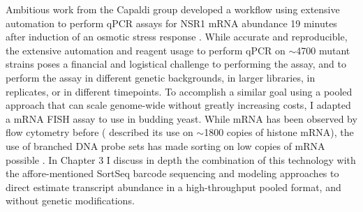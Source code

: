Ambitious work from the
Capaldi group developed a workflow using extensive automation to
perform qPCR assays for NSR1 mRNA abundance 19 minutes after induction
of an osmotic stress response 
\parencite{worley2016genome}. While accurate and
reproducible, the extensive automation and reagent usage to perform
qPCR on $\sim$4700 mutant strains poses a financial and logistical
challenge to performing the assay, and to perform the assay in
different genetic backgrounds, in larger libraries, in replicates, or
in different timepoints.  
To accomplish a similar goal using a pooled approach that can scale
genome-wide without greatly increasing costs, I adapted a mRNA
FISH assay to use in budding yeast.
While mRNA has been observed by flow cytometry before
(\cite{yu1992sensitive} described its use on $\sim$1800 copies of
histone mRNA), the use of branched DNA probe sets has made sorting
on low copies of mRNA possible \parencite{hanley2013detection}. 
In Chapter 3 I discuss in depth the combination of this technology
with the affore-mentioned SortSeq barcode sequencing and modeling
approaches to direct estimate transcript abundance in a 
high-throughput pooled format, and without genetic modifications.

